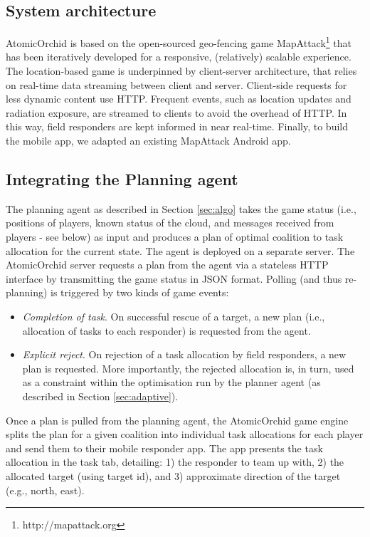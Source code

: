 \subsection{System architecture}
\noindent AtomicOrchid is based on the open-sourced geo-fencing game MapAttack\footnote{http://mapattack.org} that has been iteratively developed for a responsive, (relatively) scalable experience.  The location-based game is underpinned by client-server architecture, that relies on real-time data streaming between client and server. Client-side requests for less dynamic content use HTTP. Frequent events, such as location updates and radiation exposure, are streamed to clients to avoid the overhead of HTTP. In this way, field responders are kept informed in near real-time. Finally,  to build the mobile app, we adapted an existing MapAttack Android app.


\subsection{Integrating the Planning agent}
\noindent The planning agent as described in Section \ref{sec:algo} takes the game status (i.e., positions of players, known status of the cloud, and messages received from players - see below) as input and produces a plan of optimal coalition to task allocation for the current state. The agent is deployed on a separate server. The AtomicOrchid server requests a plan from the agent via a stateless HTTP interface by transmitting the game status in JSON format. Polling (and thus re-planning) is triggered by two kinds of game events:
\begin{itemize}
\item \textit{Completion of task}. On successful rescue of a target, a new plan (i.e., allocation of tasks to each responder) is requested from the agent.
\item \textit{Explicit reject}. On rejection of a task allocation by field responders, a new plan is requested. More importantly, the rejected allocation is, in turn, used as a constraint within the optimisation run by the planner agent (as described in Section \ref{sec:adaptive}).
\end{itemize} 

Once a plan is pulled from the planning agent, the AtomicOrchid game engine splits the plan for a given coalition into individual task allocations for each player and send them to their mobile responder app. The app presents the task allocation in the task tab, detailing: 1) the responder to team up with, 2) the allocated target (using target id), and 3) approximate direction of the target (e.g., north, east). 

